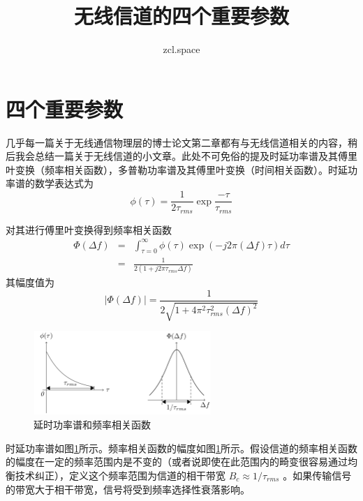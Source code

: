 \documentclass[10pt,a4paper,UTF8]{article}
\author{zcl.space}
\date{}
\title{无线信道的四个重要参数}
\begin{document}
\maketitle
\tableofcontents


\section{四个重要参数}
\label{sec:org04275e0}
几乎每一篇关于无线通信物理层的博士论文第二章都有与无线信道相关的内容，稍后我会总结一篇关于无线信道的小文章。此处不可免俗的提及时延功率谱及其傅里叶变换（频率相关函数），多普勒功率谱及其傅里叶变换（时间相关函数）。时延功率谱的数学表达式为
\begin{equation}
  \label{eq:dps}
  \phi(\tau) = \frac{1}{2\tau_{rms}} \exp{\frac{-\tau}{\tau_{rms}}}   
\end{equation}

对其进行傅里叶变换得到频率相关函数
\begin{eqnarray}
  \label{eq:fcf}
  \Phi(\Delta f) &=& \int_{\tau = 0}^{\infty} \phi(\tau) \exp(-j2\pi (\Delta f)\tau)d\tau \nonumber \\
                       &=& \frac{1}{2(1+j2\pi \tau_{rms}\Delta f)} 
\end{eqnarray}
其幅度值为
\begin{equation}
  \label{eq:mfsf}
  |\Phi(\Delta f)| = \frac{1}{2 \sqrt{1 + 4\pi^2 \tau_{rms}^{2} (\Delta f)^2}}
\end{equation}

\begin{figure}[htbp]
\centering
\includegraphics[width=0.6\textwidth]{../../img/20170314fourparameters.PNG}
\caption{\label{fig:org7e79748}
延时功率谱和频率相关函数}
\end{figure}


时延功率谱如图\ref{fig:org7e79748}所示。频率相关函数的幅度如图\ref{fig:org7e79748}所示。假设信道的频率相关函数的幅度在一定的频率范围内是不变的（或者说即使在此范围内的畸变很容易通过均衡技术纠正），定义这个频率范围为信道的相干带宽 \(B_c\approx 1/\tau_{rms}\) 。如果传输信号的带宽大于相干带宽，信号将受到频率选择性衰落影响。
\end{document}
